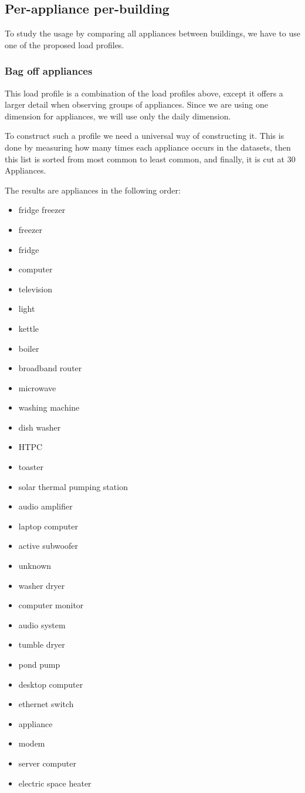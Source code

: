 \subsection{Per-appliance per-building}
To study the usage by comparing all appliances between buildings,
we have to use one of the proposed load profiles.

\subsubsection{Bag off appliances}
This load profile is a combination of the load profiles above,
except it offers a larger detail when observing groups of appliances.
Since we are using one dimension for appliances, we will use only the daily dimension.

To construct such a profile we need a universal way of constructing it.
This is done by measuring how many times each appliance occurs in the datasets,
then this list is sorted from most common to least common, and finally, it is cut at 30 Appliances.

The results are appliances in the following order:

\begin{itemize}
	\item fridge freezer
	\item freezer
	\item fridge
	\item computer
	\item television
	\item light
	\item kettle
	\item boiler
	\item broadband router
	\item microwave
	\item washing machine
	\item dish washer
	\item HTPC
	\item toaster
	\item solar thermal pumping station
	\item audio amplifier
	\item laptop computer
	\item active subwoofer
	\item unknown
	\item washer dryer
	\item computer monitor
	\item audio system
	\item tumble dryer
	\item pond pump
	\item desktop computer
	\item ethernet switch
	\item appliance
	\item modem
	\item server computer
	\item electric space heater
\end{itemize}

